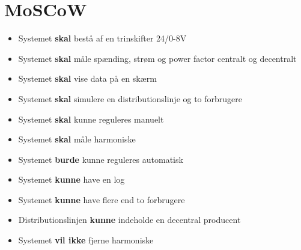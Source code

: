 
\section{MoSCoW}

\begin{itemize}
\item{Systemet \textbf{skal} bestå af en trinskifter 24/0-8V}
\item{Systemet \textbf{skal} måle spænding, strøm og power factor centralt og decentralt}
\item{Systemet \textbf{skal} vise data på en skærm}
\item{Systemet \textbf{skal} simulere en distributionslinje og to forbrugere}
\item{Systemet \textbf{skal} kunne reguleres manuelt}
\item{Systemet \textbf{skal} måle harmoniske}
\item{Systemet \textbf{burde} kunne reguleres automatisk}
\item{Systemet \textbf{kunne} have en log}
\item{Systemet \textbf{kunne} have flere end to forbrugere}
\item{Distributionslinjen \textbf{kunne} indeholde en decentral producent}
\item{Systemet \textbf{vil ikke} fjerne harmoniske} 
\end{itemize}

